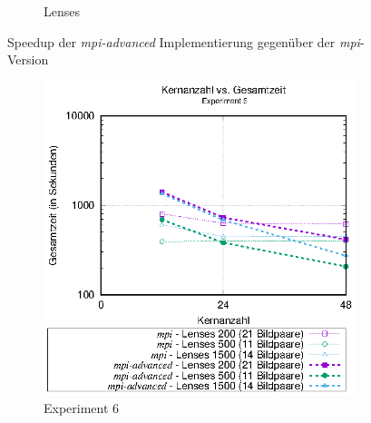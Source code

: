 \begin{center}
\begin{figure}[htbp]
\begin{subfigure}[b]{0.45\textwidth}
			\caption{Lenses}
			\label{fig:mpi_advanced_speedup_lenses}
		\end{subfigure}
		\caption{Speedup der \textit{mpi-advanced} Implementierung gegenüber der \textit{mpi}-Version}
		\label{fig:mpi_advanced_speedup}
	\end{figure}
\end{center}

\begin{center}
	\begin{figure}[htbp]
		\begin{subfigure}[b]{0.45\textwidth}
			\centering
			\includegraphics[width=\textwidth]{pdf/mpi_advanced_times_exp6}
			\caption{Experiment 6}
			\label{fig:mpi_advanced_times_exp6}
		\end{subfigure}
		\hfill
		\begin{subfigure}[b]{0.45\textwidth}
			\centering

\end{subfigure}
\end{figure}
\end{center}
